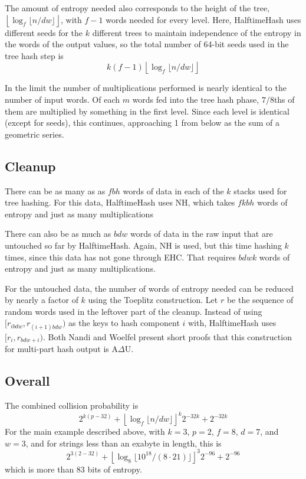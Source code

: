 \documentclass[sigconf, nonacm]{acmart}
\begin{document}
The amount of entropy needed also corresponds to the height of the tree, $\left\lfloor\log_f \lfloor n/dw\rfloor\right\rfloor$, with $f - 1$ words needed for every level.
Here, HalftimeHash uses different seeds for the $k$ different trees to maintain independence of the entropy in the words of the output values, so the total number of 64-bit seeds used in the tree hash step is \[k(f-1)\left\lfloor\log_f \lfloor n/dw\rfloor\right\rfloor\]

In the limit the number of multiplications performed is nearly identical to the number of input words.
Of each $m$ words fed into the tree hash phase, $7/8$ths of them are multiplied by something in the first level.
Since each level is identical (except for seeds), this continues, approaching 1 from below as the sum of a geometric series.

\subsection{Cleanup}

There can be as many as as $f b h$ words of data in each of the $k$ stacks used for tree hashing.
For this data, HalftimeHash uses NH, which takes $f k b h$ words of entropy and just as many multiplications

There can also be as much as $b d w$ words of data in the raw input that are untouched so far by HalftimeHash.
Again, NH is used, but this time hashing $k$ times, since this data has not gone through EHC.
That requires $b d w k$ words of entropy and just as many multiplications.

For the untouched data, the number of words of entropy needed can be reduced by nearly a factor of $k$ using the Toeplitz construction. 
Let $r$ be the sequence of random words used in the leftover part of the cleanup.
Instead of using $[r_{ibdw}, r_{(i+1)bdw})$ as the keys to hash component $i$ with, HalftimeHash uses $[r_{i}, r_{bdw + i})$.
Both Nandi and Woelfel present short proofs that this construction for multi-part hash output is A$\Delta$U. \cite{ehc-nandi,woelfel-toeplitz}


\subsection{Overall}

The combined collision probability is
\[2^{k(p-32)} + \left\lfloor \log_f \lfloor n / d w \rfloor \right\rfloor^k 2^{-32k} + 2^{-32k}\]
For the main example described above, with $k=3$, $p=2$, $f=8$, $d = 7$, and $w=3$, and for strings less than an exabyte in length, this is
\[2^{3(2-32)} + \left\lfloor \log_8 \lfloor 10^{18} /(8 \cdot 21) \rfloor \right\rfloor^3 2^{-96} + 2^{-96}\]
which is more than 83 bits of entropy.
\end{document}
